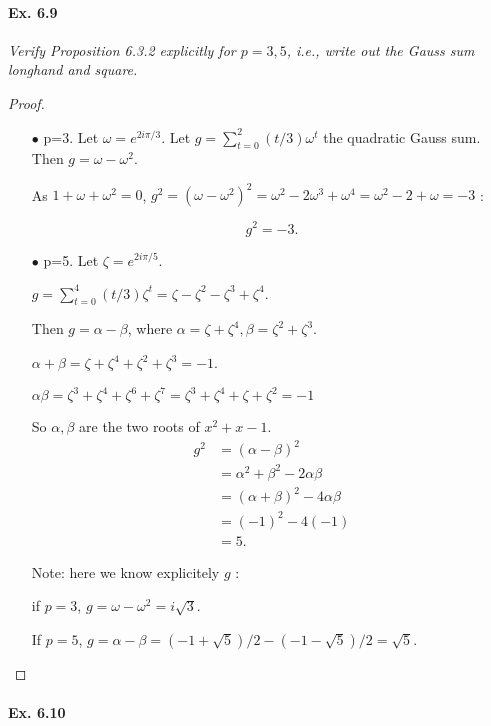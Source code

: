 \documentclass[11pt,a4paper]{article}
\begin{document}
\paragraph{Ex. 6.9}

{\it Verify Proposition 6.3.2 explicitly for $p = 3, 5$, i.e., write out the Gauss sum longhand and square.
}

\begin{proof}
\begin{enumerate}
\item[$\bullet$] p=3. Let $\omega = e^{2i\pi/3}$.
Let $g = \sum_{t=0}^2 (t/3)\omega^t$ the quadratic Gauss sum. Then $g =\omega - \omega^2$.

As $1+\omega+\omega^2 = 0$,
$g^2 = (\omega- \omega^2)^2 = \omega^2 - 2 \omega^3 + \omega^4 = \omega^2 - 2 + \omega  =-3$ :

$$g^2 = -3.$$

\item[$\bullet$] p=5. Let $\zeta= e^{2i\pi/5}$.

$g = \sum_{t=0}^4 (t/3)\zeta^t = \zeta- \zeta^2-\zeta^3+\zeta^4.$ 

Then $g = \alpha - \beta$, where $\alpha = \zeta + \zeta^4, \beta = \zeta^2+\zeta^3$.

$\alpha + \beta = \zeta + \zeta^4+\zeta^2 + \zeta^3 = -1$.

$\alpha \beta= \zeta^3+ \zeta^4+\zeta^6+\zeta^7 = \zeta^3+ \zeta^4+\zeta+\zeta^2 = -1$

So $\alpha, \beta$ are the two roots of $x^2+x-1$.
\begin{align*}
g^2 &= (\alpha - \beta)^2\\
&=\alpha^2+\beta^2 - 2 \alpha \beta\\
&=(\alpha+ \beta)^2 - 4 \alpha \beta\\
&= (-1)^2-4(-1)\\
&= 5.
\end{align*}

Note: here we know explicitely $g$ :

if $p = 3$, $g = \omega - \omega^2 = i \sqrt{3}$.

If $p=5$, $g = \alpha - \beta = (-1+\sqrt{5})/2 - (-1 - \sqrt{5})/2 = \sqrt{5}$.
\end{enumerate}
\end{proof}

\paragraph{Ex. 6.10}
\end{document}

